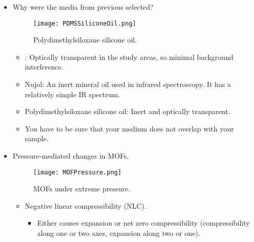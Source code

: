 \documentclass[../notes.tex]{subfiles}
\begin{document}
\begin{itemize}
\begin{itemize}
        \item Pressure-transmitting medium 1 was : Irreversible amorphization (collapsing) of the empty structure occurs at about \SI{0.4}{\giga\pascal}.
        \item Pressure-transmitting medium 2 was oil: Slight lattice expansion and a strong modification of the peak frequency and shape of the MOF hydroxyl vibration below \SI{0.1}{\giga\pascal}.
        \item Pressure-transmitting medium 3 was high-viscosity polydimethylsiloxane silicone oil: Framework stability is enhanced under pressure with the amorphization onset shifted to about \SI{7}{\giga\pascal}.
    \end{itemize}
    \item Why were the media from previous selected?
    \begin{figure}[h!]
        \centering
        \texttt{[image: PDMSSiliconeOil.png]}
        \caption{Polydimethylsiloxane silicone oil.}
        \label{fig:PDMSSiliconeOil}
    \end{figure}
    \begin{itemize}
        \item {}: Optically transparent in the study areas, so minimal background interference.
        \item Nujol: An inert mineral oil used in infrared spectroscopy. It has a relatively simple IR spectrum.
        \item Polydimethylsiloxane silicone oil: Inert and optically transparent.
        \item You have to be sure that your medium does not overlap with your sample.
    \end{itemize}
    \item Pressure-mediated changes in MOFs.
    \begin{figure}[h!]
        \centering
        \texttt{[image: MOFPressure.png]}
        \caption{MOFs under extreme pressure.}
        \label{fig:MOFPressure}
    \end{figure}
    \begin{itemize}
        \item Negative linear compressibility (NLC).
        \begin{itemize}
            \item Either causes expansion or net zero compressibility (compressibility along one or two axes, expansion along two or one).
        \end{itemize}

\end{itemize}
\end{itemize}
\end{document}
